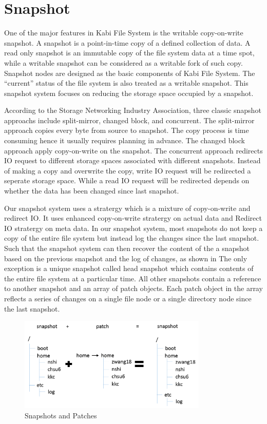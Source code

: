 \chapter{Snapshot}
\label{chap:snapshot}

    One of the major features in Kabi File System is the writable copy-on-write snapshot. A snapshot is a point-in-time copy of a defined collection of data.\cite{snapshot_def} A read only snapshot is an immutable copy of the file system data at a time spot, while a writable snapshot can be considered as a writable fork of such copy. Snapshot nodes are designed as the basic components of Kabi File System. The ``current'' status of the file system is also treated as a writable snapshot. This snapshot system focuses on reducing the storage space occupied by a snapshot.

    According to the Storage Networking Industry Association, three classic snapshot approachs include split-mirror, changed block, and concurrent.\cite{snapshot_types} The split-mirror approach copies every byte from source to snapshot. The copy process is time consuming hence it usually requires planning in advance. The changed block approach apply copy-on-write on the snapshot. The concurrent approach redirects IO request to different storage spaces associated with different snapshots. Instead of making a copy and overwrite the copy, write IO request will be redirected a seperate storage space. While a read IO request will be redirected depends on whether the data has been changed since last snapshot.

    Our snapshot system uses a stratergy which is a mixture of copy-on-write and redirect IO. It uses enhanced copy-on-write stratergy on actual data and Redirect IO stratergy on meta data. In our snapshot system, most snapshots do not keep a copy of the entire file system but instead log the changes since the last snapshot. Such that the snapshot system can then recover the content of the a snapshot based on the previous snapshot and the log of changes, as shown in  The only exception is a unique snapshot called head snapshot which contains contents of the entire file system at a particular time. All other snapshots contain a reference to another snapshot and an array of patch objects. Each patch object in the array reflects a series of changes on a single file node or a single directory node since the last snapshot.

\begin{figure}[hbtp]
\centering
\includegraphics[width=0.8\textwidth]{Chapter-4/figs/fig23.png}
\caption{Snapshots and Patches}
\label{fig:snapshot_patch}
\end{figure}

